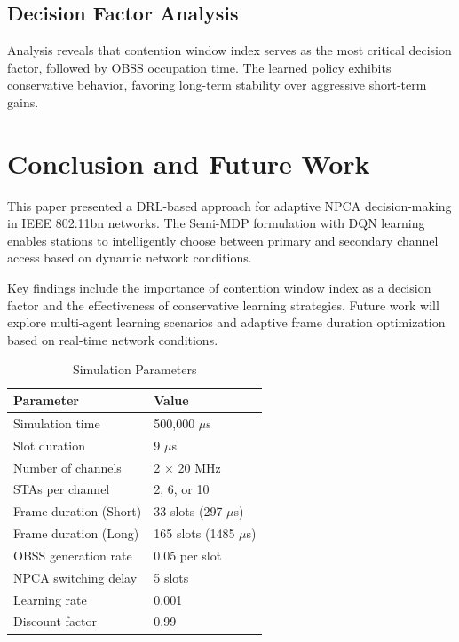 \documentclass[conference]{IEEEtran}
\begin{document}
\subsection{Decision Factor Analysis}

Analysis reveals that contention window index serves as the most critical decision factor, followed by OBSS occupation time. The learned policy exhibits conservative behavior, favoring long-term stability over aggressive short-term gains.

\section{Conclusion and Future Work}

This paper presented a DRL-based approach for adaptive NPCA decision-making in IEEE 802.11bn networks. The Semi-MDP formulation with DQN learning enables stations to intelligently choose between primary and secondary channel access based on dynamic network conditions.

Key findings include the importance of contention window index as a decision factor and the effectiveness of conservative learning strategies. Future work will explore multi-agent learning scenarios and adaptive frame duration optimization based on real-time network conditions.

\begin{table}[htbp]
\caption{Simulation Parameters}
\begin{center}
\begin{tabular}{|l|l|}
\hline
\textbf{Parameter} & \textbf{Value} \\
\hline
Simulation time & 500,000 $\mu$s \\
Slot duration & 9 $\mu$s \\
Number of channels & 2 $\times$ 20 MHz \\
STAs per channel & 2, 6, or 10 \\
Frame duration (Short) & 33 slots (297 $\mu$s) \\
Frame duration (Long) & 165 slots (1485 $\mu$s) \\
OBSS generation rate & 0.05 per slot \\
NPCA switching delay & 5 slots \\
Learning rate & 0.001 \\
Discount factor & 0.99 \\
\hline
\end{tabular}
\label{tab:params}
\end{center}
\end{table}
\end{document}

